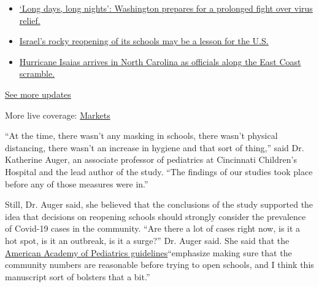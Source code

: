 \begin{itemize}
\tightlist
\item
  \href{https://www.nytimes3xbfgragh.onion/2020/08/04/world/coronavirus-covid-19.html?action=click\&pgtype=Article\&state=default\&region=MAIN_CONTENT_1\&context=storylines_live_updates\#link-6b644638}{`Long
  days, long nights': Washington prepares for a prolonged fight over
  virus relief.}
\item
  \href{https://www.nytimes3xbfgragh.onion/2020/08/04/world/coronavirus-covid-19.html?action=click\&pgtype=Article\&state=default\&region=MAIN_CONTENT_1\&context=storylines_live_updates\#link-7af9fca0}{Israel's
  rocky reopening of its schools may be a lesson for the U.S.}
\item
  \href{https://www.nytimes3xbfgragh.onion/2020/08/04/world/coronavirus-covid-19.html?action=click\&pgtype=Article\&state=default\&region=MAIN_CONTENT_1\&context=storylines_live_updates\#link-33bf9168}{Hurricane
  Isaias arrives in North Carolina as officials along the East Coast
  scramble.}
\end{itemize}

\href{https://www.nytimes3xbfgragh.onion/2020/08/04/world/coronavirus-covid-19.html?action=click\&pgtype=Article\&state=default\&region=MAIN_CONTENT_1\&context=storylines_live_updates}{See
more updates}

More live coverage:
\href{https://www.nytimes3xbfgragh.onion/live/2020/08/03/business/stock-market-today-coronavirus?action=click\&pgtype=Article\&state=default\&region=MAIN_CONTENT_1\&context=storylines_live_updates}{Markets}

``At the time, there wasn't any masking in schools, there wasn't
physical distancing, there wasn't an increase in hygiene and that sort
of thing,'' said Dr. Katherine Auger, an associate professor of
pediatrics at Cincinnati Children's Hospital and the lead author of the
study. ``The findings of our studies took place before any of those
measures were in.''

Still, Dr. Auger said, she believed that the conclusions of the study
supported the idea that decisions on reopening schools should strongly
consider the prevalence of Covid-19 cases in the community. ``Are there
a lot of cases right now, is it a hot spot, is it an outbreak, is it a
surge?'' Dr. Auger said. She said that the
\href{https://mailcastr.com/links/t/MTExMDY2Ojo6MjRkZTk2ZWM3NjNiNDVlNjg1NGI2ZWNhM2MwMmJlNGU6OnYzOjoxNTk1OTg4MDMyOjox/brMxW}{American
Academy of Pediatrics guidelines}``emphasize making sure that the
community numbers are reasonable before trying to open schools, and I
think this manuscript sort of bolsters that a bit.''

